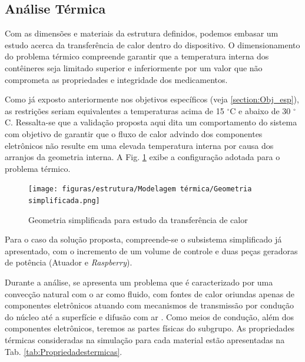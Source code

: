 \subsection{Análise Térmica} \label{section:AnaliseTermica}


Com as dimensões e materiais da estrutura definidos, podemos embasar um estudo acerca da transferência de calor dentro do dispositivo. O dimensionamento do problema térmico compreende garantir que a temperatura interna dos contêineres seja limitado superior e inferiormente por um valor que não comprometa as propriedades e integridade dos medicamentos. 

Como já exposto anteriormente nos objetivos específicos (veja \ref{section:Obj_esp}), as restrições seriam equivalentes a temperaturas acima de 15 $^{\circ}$C e abaixo de 30 $^{\circ}$C. Ressalta-se que a validação proposta aqui dita um comportamento do sistema com objetivo de garantir que o fluxo de calor advindo dos componentes eletrônicos não resulte em uma elevada temperatura interna por causa dos arranjos da geometria interna. A Fig. \ref{fig:subgrupo_termico} exibe a configuração adotada para o problema térmico.

\begin{figure}[ht]
        \centering
        \texttt{[image: figuras/estrutura/Modelagem térmica/Geometria simplificada.png]}
        \caption{Geometria simplificada para estudo da transferência de calor}
        \label{fig:subgrupo_termico}
    \end{figure}

Para o caso da solução proposta, compreende-se o subsistema simplificado já apresentado, com o incremento de um volume de controle e duas peças geradoras de potência (Atuador e \textit{Raspberry}). 

Durante a análise, se apresenta um problema que é caracterizado por uma convecção natural com o ar como fluido, com fontes de calor oriundas apenas de componentes eletrônicos atuando com mecanismos de transmissão por condução do núcleo até a superfície e difusão com ar \cite{transcal}. Como meios de condução, além dos componentes eletrônicos, teremos as partes físicas do subgrupo. As propriedades térmicas consideradas na simulação para cada material estão apresentadas na Tab. \ref{tab:Propriedadestermicas}.

